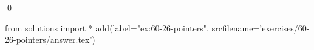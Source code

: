 
\begin{ex}
  \label{ex:60-26-pointers}
  
  \qed
\end{ex}
\begin{python0}
from solutions import *
add(label="ex:60-26-pointers",
    srcfilename='exercises/60-26-pointers/answer.tex')
\end{python0}
